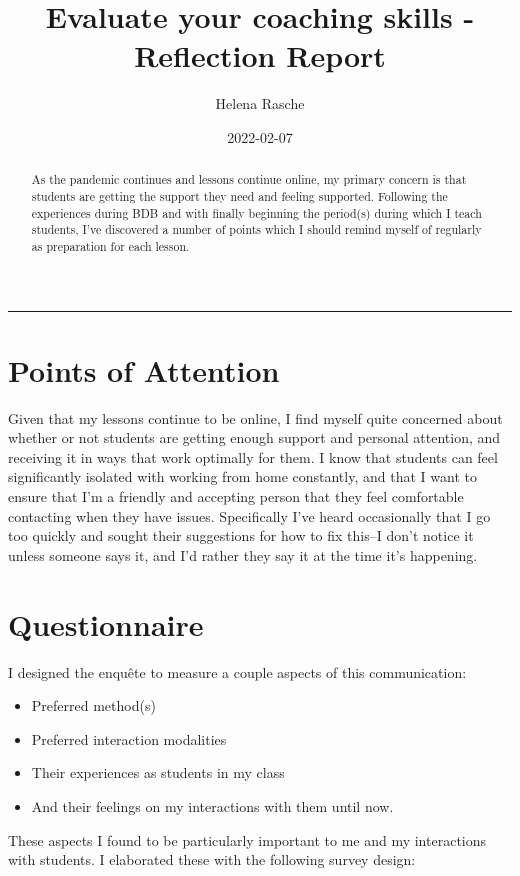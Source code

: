 \documentclass[paper=a4,justified,a4paper]{tufte-handout}
\title{Evaluate your coaching skills - Reflection Report}
\author{Helena Rasche}
\date{2022-02-07}
\providecommand{\tightlist}{%
  \setlength{\itemsep}{0pt}\setlength{\parskip}{0pt}}
\begin{document}
\maketitle
\begin{abstract}
As the pandemic continues and lessons continue online, my primary
concern is that students are getting the support they need and feeling
supported. Following the experiences during BDB and with finally
beginning the period(s) during which I teach students, I've discovered a
number of points which I should remind myself of regularly as
preparation for each lesson.
\end{abstract}
\noindent\rule{5in}{0.4pt}


\hypertarget{points-of-attention}{%
\section{Points of Attention}\label{points-of-attention}}

Given that my lessons continue to be online, I find myself quite
concerned about whether or not students are getting enough support and
personal attention, and receiving it in ways that work optimally for
them. I know that students can feel significantly isolated with working
from home constantly, and that I want to ensure that I'm a friendly and
accepting person that they feel comfortable contacting when they have
issues. Specifically I've heard occasionally that I go too quickly and
sought their suggestions for how to fix this--I don't notice it unless
someone says it, and I'd rather they say it at the time it's happening.

\hypertarget{questionnaire}{%
\section{Questionnaire}\label{questionnaire}}

I designed the enquête to measure a couple aspects of this
communication:

\begin{itemize}
\tightlist
\item
  Preferred method(s)
\item
  Preferred interaction modalities
\item
  Their experiences as students in my class
\item
  And their feelings on my interactions with them until now.
\end{itemize}

These aspects I found to be particularly important to me and my
interactions with students. I elaborated these with the following survey
design:
\end{document}

